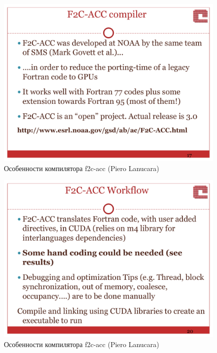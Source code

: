 \documentclass[a4,12pt]{report}
\begin{document}
\begin{figure}
\centering
\includegraphics[scale=0.4]{slides/08.pdf}
\caption{Особенности компилятора f2c-acc (Piero Lanucara)}
\label{fig:08}
\end{figure}

\begin{figure}
\centering
\includegraphics[scale=0.4]{slides/09.pdf}
\caption{Особенности компилятора f2c-acc (Piero Lanucara)}
\label{fig:09}
\end{figure}
\end{document}
